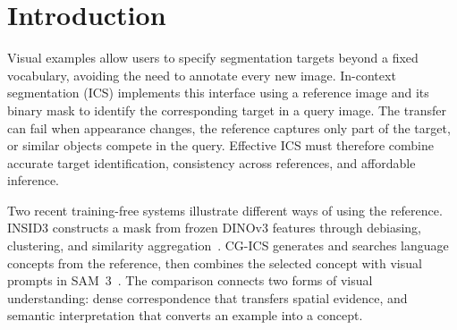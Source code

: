 \begin{abstract}
Visual examples provide a flexible way to specify segmentation targets without task-specific retraining. In-context segmentation (ICS) uses an annotated reference to predict a target mask in a query image. This study compares INSID3 and CG-ICS on COCO-$20^i$ and LVIS-$92^i$ through accuracy, reference sensitivity, and inference cost. CG-ICS achieves mean-fold class-pooled IoU of 72.17\% and 47.44\%, versus 57.65\% and 40.77\% for INSID3. On inputs matched by runner GPU model, its mean inference latency is 7.37--10.63 times higher, with an additional language-model GPU. Ablations identify substantial gains from INSID3's feature processing and CG-ICS's combination of semantic concepts and visual prompts. Further search adds 0.22 equal-query IoU points on COCO and 2.30 on LVIS, with smaller marginal gains when visual prompts are present. These findings motivate Agreement-Gated Search (AGS), which uses text--visual mask agreement to allocate concept search. A cost--accuracy decomposition identifies the computation savings and prediction changes that determine its value. Code is available at \url{https://github.com/AvianHan/CE6190-Visual-Understanding}.
\end{abstract}

\section{Introduction}
Visual examples allow users to specify segmentation targets beyond a fixed vocabulary, avoiding the need to annotate every new image. In-context segmentation (ICS) implements this interface using a reference image and its binary mask to identify the corresponding target in a query image. The transfer can fail when appearance changes, the reference captures only part of the target, or similar objects compete in the query. Effective ICS must therefore combine accurate target identification, consistency across references, and affordable inference.

Two recent training-free systems illustrate different ways of using the reference. INSID3 constructs a mask from frozen DINOv3 features through debiasing, clustering, and similarity aggregation~\cite{insid3,dinov3}. CG-ICS generates and searches language concepts from the reference, then combines the selected concept with visual prompts in SAM~3~\cite{cgics,sam3}. The comparison connects two forms of visual understanding: dense correspondence that transfers spatial evidence, and semantic interpretation that converts an example into a concept.

